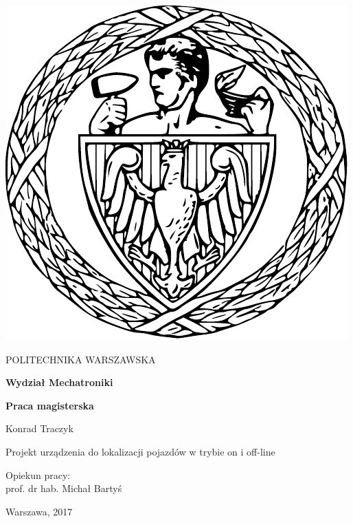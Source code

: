 
\thispagestyle {empty}

\begin{center}
	\includegraphics[scale=0.4]{img/pw}
	
	\vspace{0.5cm}
	
	{\fontsize{20}{20}\selectfont POLITECHNIKA WARSZAWSKA}
	
	\vspace{1.0cm}
	
	\textbf{{\fontsize{14}{14}\selectfont Wydział Mechatroniki}}
	
	\vspace{1.5cm}
	
	\textbf{{\fontsize{14}{14}\selectfont Praca magisterska}}

	\vspace{2.0cm}
	
	{\fontsize{14}{14}\selectfont Konrad Traczyk}
	
	\vspace{1cm}
	
	{\fontsize{28}{28}\selectfont Projekt urządzenia do lokalizacji pojazdów w trybie on i off-line}
	
	\vspace{1cm}
	\begin{flushright}
		{\fontsize{14}{14}\selectfont Opiekun pracy: \\ 
		prof. dr hab. Michał Bartyś}
	
		\vspace{1cm}
		

		
	\end{flushright}
	
	\vspace{1cm}
	
	{\fontsize{12}{12}\selectfont Warszawa, 2017}
	
	
\end{center}